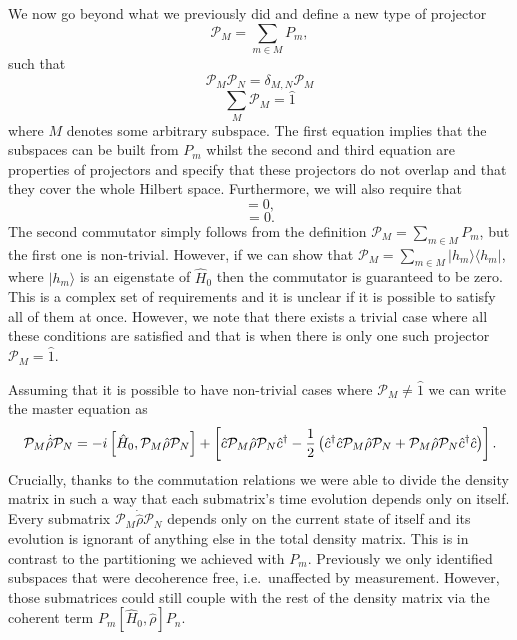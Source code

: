 We now go beyond what we previously did and define a new type of
projector 
\begin{equation}
  \mathcal{P}_M = \sum_{m \in M} P_m,
\end{equation}
such that 
\begin{equation}
  \mathcal{P}_M \mathcal{P}_N = \delta_{M,N} \mathcal{P}_M
\end{equation}
\begin{equation}
  \sum_M \mathcal{P}_M = \hat{1}
\end{equation}
where $M$ denotes some arbitrary subspace. The first equation implies that
the subspaces can be built from
$P_m$ whilst the second and third equation are properties of
projectors and specify that these projectors do not overlap and that
they cover the whole Hilbert space. Furthermore, we will also require
that 
\begin{equation}
  [\mathcal{P}_M, \hat{H}_0 ] = 0,
\end{equation}
\begin{equation}
  [\mathcal{P}_M, \c] = 0. 
\end{equation}
The second commutator simply follows from the definition
$\mathcal{P}_M = \sum_{m \in M} P_m$, but the first one is
non-trivial. However, if we can show that
$\mathcal{P}_M = \sum_{m \in M} | h_m \rangle \langle h_m |$, where
$| h_m \rangle$ is an eigenstate of $\hat{H}_0$ then the commutator is
guaranteed to be zero. This is a complex set of requirements and it is
unclear if it is possible to satisfy all of them at once. However, we
note that there exists a trivial case where all these conditions are
satisfied and that is when there is only one such projector
$\mathcal{P}_M = \hat{1}$.

Assuming that it is possible to have non-trivial cases where
$\mathcal{P}_M \ne \hat{1}$ we can write the master equation as
\begin{equation} 
  \label{eq:bigP}
  \mathcal{P}_M \dot{\hat{\rho}} \mathcal{P}_N = -i
  \left[\hat{H}_0, \mathcal{P}_M \hat{\rho} \mathcal{P}_N \right] +
  \left[ \hat{c} \mathcal{P}_M \hat{\rho}
  \mathcal{P}_N \hat{c}^\dagger - \frac{1}{2} \left( \hat{c}^\dagger \hat{c} \mathcal{P}_M \hat{\rho}
  \mathcal{P}_N + \mathcal{P}_M \hat{\rho} \mathcal{P}_N \hat{c}^\dagger \hat{c} \right)
  \right].
\end{equation} 
Crucially, thanks to the commutation relations we were able to divide
the density matrix in such a way that each submatrix's time evolution
depends only on itself. Every submatrix
$\mathcal{P}_M \dot{\hat{\rho}} \mathcal{P}_N$ depends only on the
current state of itself and its evolution is ignorant of anything else
in the total density matrix. This is in contrast to the partitioning
we achieved with $P_m$. Previously we only identified subspaces that
were decoherence free, i.e.~unaffected by measurement. However, those
submatrices could still couple with the rest of the density matrix via
the coherent term $P_m [\hat{H}_0, \hat{\rho}] P_n$.

